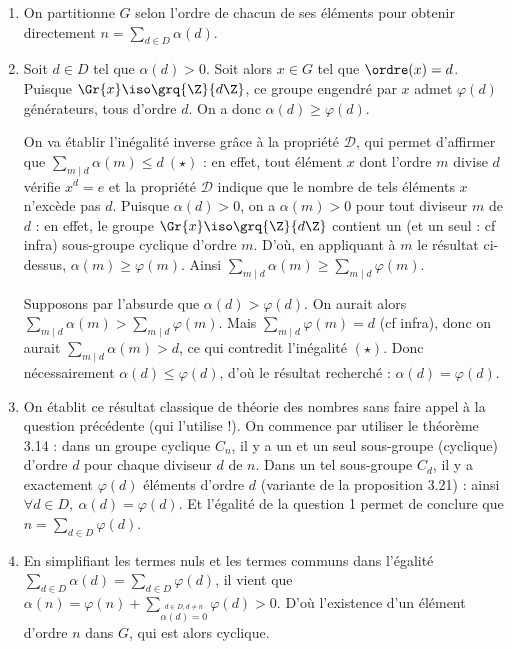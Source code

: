 \begin{enumerate}
 \item On partitionne $G$ selon l'ordre de chacun de ses éléments pour obtenir directement $n =\sum\limits_{d\in D} \alpha(d)$.

 \item Soit $d\in D$ tel que $\alpha(d) >0$. Soit alors $x\in G$ tel que $\ordre(x) = d$. Puisque $\Gr{x} \iso \grq{\Z}{d\Z}$, ce groupe engendré par $x$ admet $\varphi(d)$ générateurs, tous d'ordre $d$. On a donc $\alpha(d) \geqslant \varphi(d)$.

 On va établir l'inégalité inverse grâce à la propriété $\mathcal{D}$, qui permet d'affirmer que $\sum\limits_{m\mid d}\alpha(m) \leqslant d~ (\star)$ : en effet, tout élément $x$ dont l'ordre $m$ divise $d$ vérifie $x^d =e$ et la propriété $\mathcal{D}$ indique que le nombre de tels éléments $x$ n'excède pas $d$. Puisque $\alpha(d) >0$, on a $\alpha(m)>0$ pour tout diviseur $m$ de $d$ : en effet, le groupe $\Gr{x} \iso \grq{\Z}{d\Z}$ contient un (et un seul : cf infra) sous-groupe cyclique d'ordre $m$. D'où, en appliquant à $m$ le résultat ci-dessus, $\alpha(m) \geqslant \varphi(m)$. Ainsi $\sum\limits_{m\mid d}\alpha(m) \geqslant \sum\limits_{m\mid d} \varphi(m)$.

 Supposons par l'absurde que $\alpha(d) > \varphi(d)$. On aurait alors $\sum\limits_{m\mid d}\alpha(m)> \sum\limits_{m\mid d} \varphi(m)$. Mais $\sum\limits_{m\mid d} \varphi(m) = d$ (cf infra), donc on aurait $\sum\limits_{m\mid d}\alpha(m) > d$, ce qui contredit l'inégalité $(\star)$. Donc nécessairement $\alpha(d) \leqslant \varphi(d)$, d'où le résultat recherché : $\alpha(d) = \varphi(d)$.

 \item On établit ce résultat classique de théorie des nombres sans faire appel à la question précédente (qui l'utilise !). On commence par utiliser le théorème 3.14 : dans un groupe cyclique $C_n$, il y a un et un seul sous-groupe (cyclique) d'ordre $d$ pour chaque diviseur $d$ de $n$. Dans un tel sous-groupe $C_d$, il y a exactement $\varphi(d)$ éléments d'ordre $d$ (variante de la proposition 3.21) : ainsi $\forall d\in D,~ \alpha(d) =\varphi(d)$. Et l'égalité de la question 1 permet de conclure que $n = \sum\limits_{d\in D} \varphi(d)$.

 \item En simplifiant les termes nuls et les termes communs dans l'égalité $\sum\limits_{d\in D} \alpha(d) = \sum\limits_{d\in D} \varphi(d)$, il vient que $\alpha(n) = \varphi(n) + \sum\limits_{\stackrel{d\in D, d\neq n}{\alpha(d) = 0}} \varphi(d) > 0$. D'où l'existence d'un élément d'ordre $n$ dans $G$, qui est alors cyclique.
\end{enumerate}



